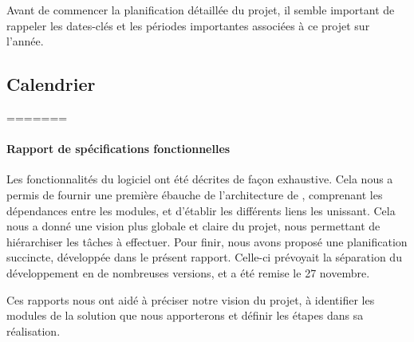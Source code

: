 	Avant de commencer la planification détaillée du projet, il semble important de rappeler les dates-clés et les périodes importantes associées à ce projet sur l'année.

	\subsection{Calendrier} %


=======
	\paragraph{Rapport de spécifications fonctionnelles} Les fonctionnalités du logiciel ont été décrites de façon exhaustive. Cela nous a permis de fournir une première ébauche de l'architecture de \glasir{}, comprenant les dépendances entre les modules, et d'établir les différents liens les unissant. Cela nous a donné une vision plus globale et claire du projet, nous permettant de hiérarchiser les tâches à effectuer. Pour finir, nous avons proposé une planification succincte, développée dans le présent rapport. Celle-ci prévoyait la séparation du développement en de nombreuses versions, et a été remise le 27 novembre.

	Ces rapports nous ont aidé à préciser notre vision du projet, à identifier les modules de la solution que nous apporterons et définir les étapes dans sa réalisation.

